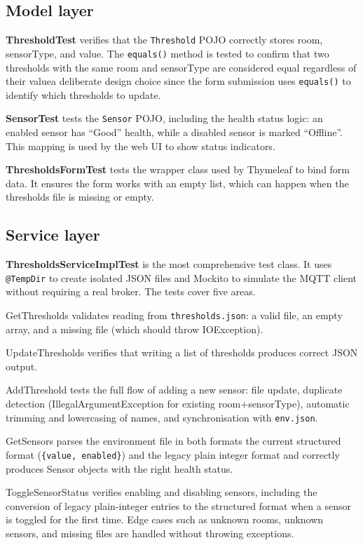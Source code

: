 \documentclass[a4paper,12pt]{report}
\begin{document}
\subsection*{Model layer}

\textbf{ThresholdTest} verifies that the \texttt{Threshold} POJO correctly
stores room, sensorType, and value. The \texttt{equals()} method is tested
to confirm that two thresholds with the same room and sensorType are
considered equal regardless of their valuea deliberate design choice
since the form submission uses \texttt{equals()} to identify which thresholds
to update.

\textbf{SensorTest} tests the \texttt{Sensor} POJO, including the health
status logic: an enabled sensor has ``Good'' health, while a disabled sensor
is marked ``Offline''. This mapping is used by the web UI to show status
indicators.

\textbf{ThresholdsFormTest} tests the wrapper class used by Thymeleaf to bind
form data. It ensures the form works with an empty list, which can happen
when the thresholds file is missing or empty.

\subsection*{Service layer}

\textbf{ThresholdsServiceImplTest} is the most comprehensive test class. It
uses \texttt{@TempDir} to create isolated JSON files and Mockito to simulate
the MQTT client without requiring a real broker. The tests cover five areas.

GetThresholds validates reading from \texttt{thresholds.json}: a valid file,
an empty array, and a missing file (which should throw IOException).

UpdateThresholds verifies that writing a list of thresholds produces correct
JSON output.

AddThreshold tests the full flow of adding a new sensor: file update,
duplicate detection (IllegalArgumentException for existing room+sensorType),
automatic trimming and lowercasing of names, and synchronisation with
\texttt{env.json}.

GetSensors parses the environment file in both formats the current
structured format (\texttt{\{value, enabled\}}) and the legacy plain integer
format and correctly produces Sensor objects with the right health status.

ToggleSensorStatus verifies enabling and disabling sensors, including the
conversion of legacy plain-integer entries to the structured format when a
sensor is toggled for the first time. Edge cases such as unknown rooms,
unknown sensors, and missing files are handled without throwing exceptions.
\end{document}
